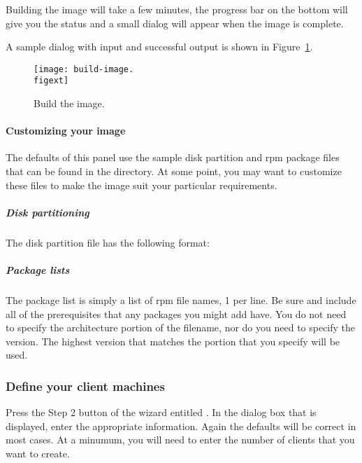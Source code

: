 Building the image will take a few minutes, the progress bar on the bottom 
will give you the status and a small dialog will appear when the image
is complete.
  
A sample dialog with input and successful output is
shown in Figure~\ref{fig:detailed-build-image}. 

\begin{figure}[htbp]
  \begin{center}
    \texttt{[image: build-image.\\figext]}
    \caption{Build the image.}
    \label{fig:detailed-build-image}
  \end{center}
\end{figure}
  
\paragraph{Customizing your image}

The defaults of this panel use the sample disk partition and rpm package files
that can be found in the  directory.
At some point, you may want to customize these files to make the image
suit your particular requirements.

\subparagraph{Disk partitioning}

The disk partition file has the following format:

\subparagraph{Package lists}
The package list is simply a list of rpm file names, 1
per line. Be sure and include all of the prerequisites that
any packages you might add have. You do not need to specify
the architecture portion of the filename, nor do you need 
to specify the version. The highest version that matches the
portion that you specify will be used.

\subsubsection{Define your client machines} 

Press the Step 2 button of the wizard entitled . In the dialog box that is displayed, enter the
appropriate information. Again the defaults will be correct in most
cases. At a minumum, you will need to enter the number of clients that you want
to create.

